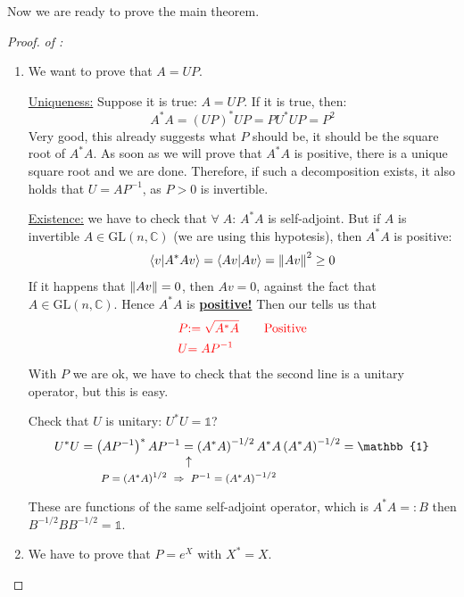 \documentclass[../main.tex]{subfiles}
\begin{document}
Now we are ready to prove the main theorem. 
\begin{proof} \textit{of :}
\renewcommand{\labelenumi}{\arabic{enumi})}
\begin{enumerate}
    \item We want to prove that $A=UP$.
    
    \underline{Uniqueness:} Suppose it is true: $A=UP$. If it is true, then:
    \[
    A^\ast A =\left(UP\right)^\ast UP=PU^\ast UP = P^2
    \]
    Very good, this already suggests what $P$ should be, it should be the square root of $A^\ast A$. As soon as we will prove that $A^\ast A$ is positive, there is a unique square root and we are done. Therefore, if such a decomposition exists, it also holds that $U=AP^{-1}$, as $P>0$ is invertible.
    
    \underline{Existence:} we have to check that $\forall\;A: \, A^\ast A$ is self-adjoint. But if $A$ is invertible $A\in\textrm{GL}(n,\mathbb{C})$ (we are using this hypotesis), then $A^\ast A$ is positive:
    \[
    \braket{v}{A^\ast Av}=\braket{Av}{Av}=\norm{Av}^2 \geq 0
    \]
    If it happens that $\norm{Av}=0$, then $Av=0$, against the fact that $A\in\textrm{GL}(n,\mathbb{C})$. Hence $A^\ast A$ is \underline{\textbf{positive!}} Then our  tells us that
    \[
    \begin{split}
    {\color{red}P}&{\color{red}:=\sqrt{A^\ast A}} \qquad {\color{red}\textrm{Positive}}\\
    {\color{red}U}&{\color{red}=A P^{-1}}
    \end{split}
    \]
    With $P$ we are ok, we have to check that the second line is a unitary operator, but this is easy.
    
    Check that $U$ is unitary: $U^\ast U = \mathbb{1}$?
    \[
    U^\ast U = \left(AP^{-1}\right)^\ast AP^{-1}\underset{\mathclap{\tikz \node {$\uparrow$} node [below=1ex] {\footnotesize  $P=\left(A^\ast A\right)^{1/2} \ \Rightarrow \ P^{-1}=\left(A^\ast A\right)^{-1/2}$};}}{=}\left(A^\ast A\right)^{-1/2}A^\ast A\left(A^\ast A\right)^{-1/2}=\mathbb{1}
    \]
    These are functions of the same self-adjoint operator, which is $A^\ast A=: B$ then $B^{-1/2}BB^{-1/2}=\mathbb{1}$.
    \item We have to prove that $P=e^X$ with $X^\ast=X$.
    

\end{enumerate}
\end{proof}
\end{document}

